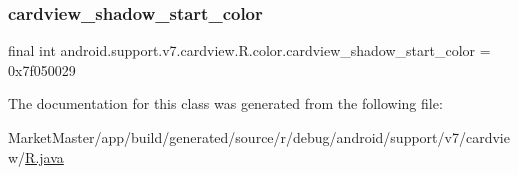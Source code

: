 \subsubsection{\texorpdfstring{cardview\+\_\+shadow\+\_\+start\+\_\+color}{cardview\_shadow\_start\_color}}
{\footnotesize\ttfamily final int android.\+support.\+v7.\+cardview.\+R.\+color.\+cardview\+\_\+shadow\+\_\+start\+\_\+color = 0x7f050029\hspace{0.3cm}{\ttfamily [static]}}



The documentation for this class was generated from the following file\+:\begin{DoxyCompactItemize}
\item 
Market\+Master/app/build/generated/source/r/debug/android/support/v7/cardview/\mbox{\hyperlink{debug_2android_2support_2v7_2cardview_2R_8java}{R.\+java}}\end{DoxyCompactItemize}
